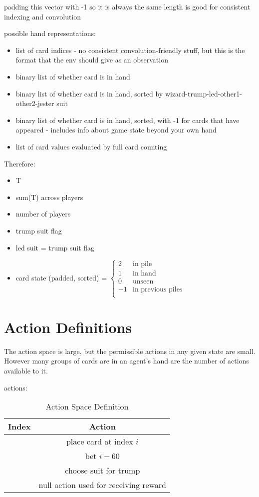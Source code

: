 \documentclass[10pt]{article} %
\begin{document}
padding this vector with -1 so it is always the same length is good for consistent indexing and convolution

possible hand representations:

\begin{itemize}
\item list of card indices - no consistent convolution-friendly stuff, but this is the format that the env should give as an observation
\item binary list of whether card is in hand
\item binary list of whether card is in hand, sorted by wizard-trump-led-other1-other2-jester suit
\item binary list of whether card is in hand, sorted, with -1 for cards that have appeared - includes info about game state beyond your own hand
\item list of card values evaluated by full card counting
\end{itemize}

Therefore:

\begin{itemize}
\item T
\item sum(T) across players
\item number of players
\item trump suit flag
\item led suit = trump suit flag
\item card state (padded, sorted) =
$\begin{cases}
2 & \text{in pile} \\
1 & \text{in hand} \\
0 & \text{unseen} \\
-1 & \text{in previous piles} \\
\end{cases}$
\end{itemize}

\section{Action Definitions}

The action space is large, but the permissible actions in any given state are small. However many groups of cards are in an agent’s hand are the number of actions available to it.

actions:

\begin{table}[h!]
\centering
\begin{tabular}{|c|c|} \hline
Index & Action \\ \hline
[0, 59] & place card at index $i$ \\ \hline
[60, 80] & bet $i-60$ \\ \hline
[81, 84] & choose suit for trump \\ \hline
[85] & null action used for receiving reward \\ \hline
\end{tabular}
\caption{Action Space Definition}
\end{table}
\end{document}
